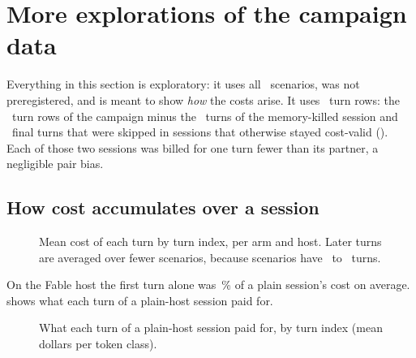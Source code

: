 \section{More explorations of the campaign data \texorpdfstring{\screen}{[screen]}}\label{sec:more}

Everything in this section is exploratory: it uses all \NScenarios\ scenarios, was not preregistered, and is
meant to show \emph{how} the costs arise. It uses \PerTurnNFmt\ turn rows: the \NTurns\ turn rows of the campaign minus the \RvKilledTurns\ turns of the
memory-killed session and \RvNSkips\ final turns that were skipped in sessions that otherwise stayed cost-valid
(\RvSkipList). Each of those two sessions was billed for one turn fewer than its partner, a negligible pair bias.

\subsection{How cost accumulates over a session}

\begin{figure}[htbp]
\centering
{}\par\smallskip

\caption{Mean cost of each turn by turn index, per arm and host. Later turns are averaged over fewer scenarios,
because scenarios have \MinTurns\ to \MaxTurns\ turns.}
\label{fig:perturn}
\end{figure}

On the Fable host the first turn alone was \TurnOneShareFable\,\% of a plain session's cost on average.
 shows what each turn of a plain-host session paid for.

\begin{figure}[htbp]
\centering
{}\par\smallskip

\caption{What each turn of a plain-host session paid for, by turn index (mean dollars per token class).}
\label{fig:turncomp}
\end{figure}

